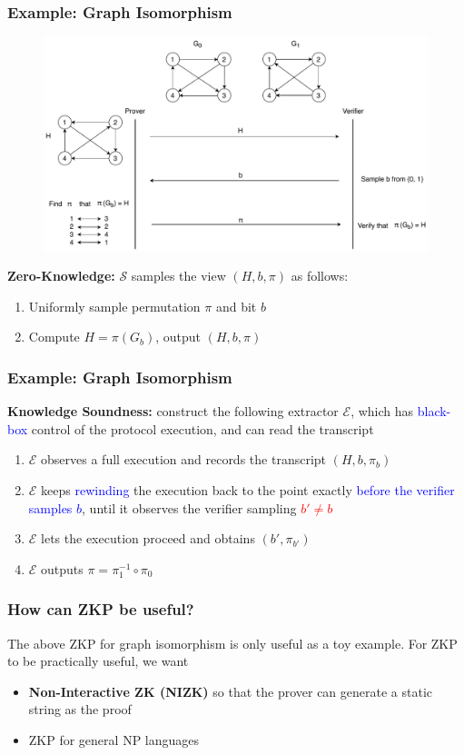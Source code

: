 \documentclass[handout]{beamer} %
\newcommand{\blue}[1]{\textcolor{blue}{#1}}
\newcommand{\red}[1]{\textcolor{red}{#1}}
\begin{document}
\frame
{
  \frametitle{Example: Graph Isomorphism}

  \onslide<+->\begin{figure}[ht!]
  \includegraphics[width=\textwidth]{images/ZKP-Graph-Isomorphism.pdf}
  \end{figure}
  \onslide<+-> \textbf{Zero-Knowledge:} $\mathcal{S}$ samples the view $(H,b,\pi)$ as follows:
  \begin{enumerate}
    \item Uniformly sample permutation $\pi$ and bit $b$
    \item Compute $H=\pi(G_b)$, output $(H,b,\pi)$
  \end{enumerate}
}

\frame
{
  \frametitle{Example: Graph Isomorphism}
  \onslide<+->\textbf{Knowledge Soundness:} construct the following extractor $\mathcal{E}$, which has \blue{black-box} control of the protocol execution, and can read the transcript
  \begin{enumerate}
    \item<+-> $\mathcal{E}$ observes a full execution and records the transcript $(H,b,\pi_b)$
    \item<+-> $\mathcal{E}$ keeps \blue{rewinding} the execution back to the point exactly \blue{before the verifier samples $b$}, until it observes the verifier sampling \red{$b'\neq b$}
    \item<+-> $\mathcal{E}$ lets the execution proceed and obtains $(b',\pi_{b'})$
    \item<+-> $\mathcal{E}$ outputs $\pi=\pi_1^{-1}\circ\pi_0$
  \end{enumerate}
}

{
  \frametitle{How can ZKP be useful?}

  \onslide<+-> The above ZKP for graph isomorphism is only useful as a toy example.
  For ZKP to be practically useful, we want
  \begin{itemize}
    \item<+-> \textbf{Non-Interactive ZK (NIZK)} so that the prover can generate a static string as the proof
    \item<+-> ZKP for general NP languages
  \end{itemize}
}
\end{document}
